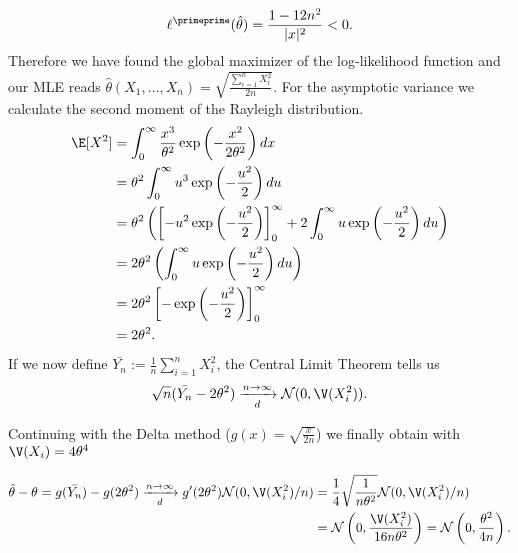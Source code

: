 \begin{solution}
\begin{enumerate}[label = (\alph*)]
  \begin{align*}
    \ell^{\primeprime}(\hat{\theta}) = \frac{1 - 12n^2}{|x|^2} < 0.
  \end{align*}
  Therefore we have found the global maximizer of the log-likelihood function
  and our MLE reads $\hat{\theta}(X_1,\dots,X_n) = 
  \sqrt{\frac{\sum_{i=1}^n X_i^2}{2n}}$.
  For the asymptotic variance we calculate the second moment of the Rayleigh distribution.
  \begin{align*}
    \E[X^2] &= \int_0^{\infty} \frac{x^3}{\theta^2}\exp\left(-\frac{x^2}{2\theta^2}\right) dx \\
    &= \theta^2 \int_0^{\infty} u^3\exp\left(-\frac{u^2}{2}\right) du \\
    &= \theta^2\left( \left[-u^2\exp\left(-\frac{u^2}{2}\right)\right]_0^\infty
    + 2 \int_0^{\infty} u \exp\left(-\frac{u^2}{2}\right) du\right) \\
    &= 2\theta^2\left(\int_0^{\infty} u \exp\left(-\frac{u^2}{2}\right) du\right) \\
    &= 2\theta^2\left[-\exp\left(-\frac{u^2}{2}\right)\right]_0^\infty \\
    &= 2\theta^2.
  \end{align*}
  If we now define $\bar{Y_n} := \frac{1}{n}\sum_{i=1}^n X_i^2$, the
  Central Limit Theorem tells us
  \begin{align*}
    \sqrt{n}(\bar{Y_n} - 2\theta^2) \xrightarrow[d]{n \to \infty} 
    \mathcal{N}(0,\V(X_i^2)).
  \end{align*}

  Continuing with the Delta method ($g(x) = \sqrt{\frac{x}{2n}}$) we finally
  obtain with $\V(X_i) = 4\theta^4$

  \begin{align*}
    \hat{\theta} - \theta = g(\bar{Y_n}) - g(2\theta^2)
    \xrightarrow[d]{n \to \infty} g'(2\theta^2)\mathcal{N}(0,\V(X_i^2)/n)
    &= \frac{1}{4}\sqrt{\frac{1}{n\theta^2}}\mathcal{N}(0,\V(X_i^2)/n) \\
    &= \mathcal{N}\left(0,\frac{\V(X_i^2)}{16n\theta^2}\right)
    = \mathcal{N}\left(0,\frac{\theta^2}{4n}\right).
  \end{align*}

\end{enumerate}

\end{solution}

